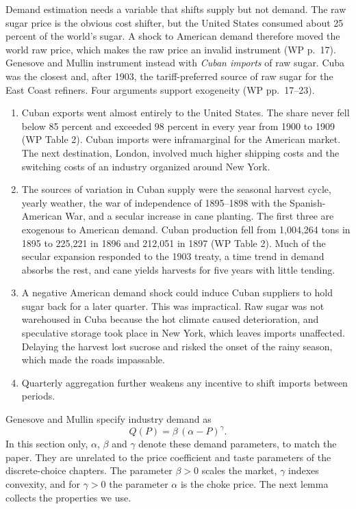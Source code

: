 Demand estimation needs a variable that shifts supply but not demand. The raw sugar price is the obvious
cost shifter, but the United States consumed about 25 percent of the world's sugar. A shock to American
demand therefore moved the world raw price, which makes the raw price an invalid instrument (WP p.~17).
Genesove and Mullin instrument instead with \emph{Cuban imports} of raw sugar. Cuba was the closest and,
after 1903, the tariff-preferred source of raw sugar for the East Coast refiners. Four arguments support
exogeneity (WP pp.~17--23).
\begin{enumerate}[label=(\alph*)]
\item Cuban exports went almost entirely to the United States. The share never fell below 85 percent and
exceeded 98 percent in every year from 1900 to 1909 (WP Table 2). Cuban imports were inframarginal for the
American market. The next destination, London, involved much higher shipping costs and the switching costs
of an industry organized around New York.
\item The sources of variation in Cuban supply were the seasonal harvest cycle, yearly weather, the war of
independence of 1895--1898 with the Spanish-American War, and a secular increase in cane planting. The first
three are exogenous to American demand. Cuban production fell from 1,004,264 tons in 1895 to 225,221 in 1896
and 212,051 in 1897 (WP Table 2). Much of the secular expansion responded to the 1903 treaty, a time trend
in demand absorbs the rest, and cane yields harvests for five years with little tending.
\item A negative American demand shock could induce Cuban suppliers to hold sugar back for a later quarter.
This was impractical. Raw sugar was not warehoused in Cuba because the hot climate caused deterioration,
and speculative storage took place in New York, which leaves imports unaffected. Delaying the harvest lost
sucrose and risked the onset of the rainy season, which made the roads impassable.
\item Quarterly aggregation further weakens any incentive to shift imports between periods.
\end{enumerate}

Genesove and Mullin specify industry demand as
\begin{equation}\label{eq:03-gm-demand}
Q(P) = \beta\,(\alpha - P)^{\gamma} .
\end{equation}
In this section only, $\alpha$, $\beta$ and $\gamma$ denote these demand parameters, to match the paper. They
are unrelated to the price coefficient and taste parameters of the discrete-choice chapters. The parameter
$\beta > 0$ scales the market, $\gamma$ indexes convexity, and for $\gamma > 0$ the parameter $\alpha$ is the
choke price. The next lemma collects the properties we use.

